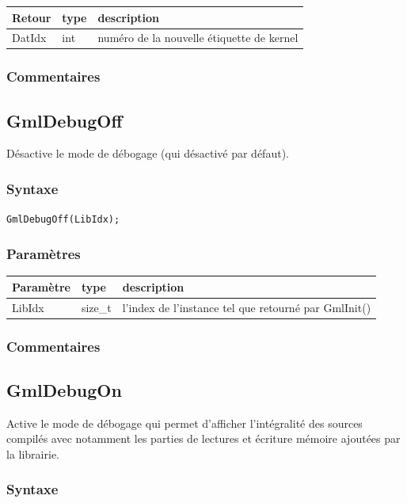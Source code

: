\documentclass[a4paper,12pt]{article}
\begin{document}
\medskip


\begin{tabular}{|m{2cm}|m{1.5cm}|m{10.5cm}|}
\hline
Retour     & type   & description \\
\hline
DatIdx     & int    & numéro de la nouvelle étiquette de kernel\\
\hline
\end{tabular}

\subsubsection*{Commentaires}


\subsection{GmlDebugOff}

Désactive le mode de débogage (qui désactivé par défaut).

\subsubsection*{Syntaxe}

{\tt GmlDebugOff(LibIdx);}
\subsubsection*{Paramètres}

\begin{tabular}{|m{2cm}|m{1.5cm}|m{10.5cm}|}
\hline
Paramètre  & type    & description \\
\hline
LibIdx     & size\_t & l'index de l'instance tel que retourné par GmlInit() \\
\hline
\end{tabular}
\subsubsection*{Commentaires}


\subsection{GmlDebugOn}

Active le mode de débogage qui permet d'afficher l'intégralité des sources compilés avec notamment les parties de lectures et écriture mémoire ajoutées par la librairie.

\subsubsection*{Syntaxe}
\end{document}
